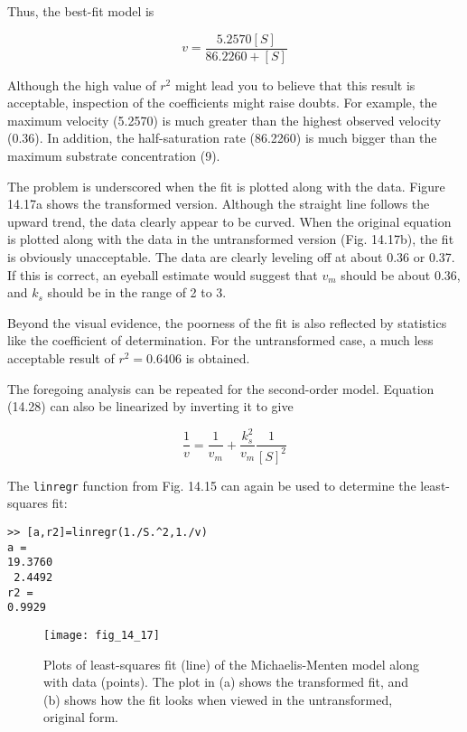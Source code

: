 \documentclass[../main.tex]{subfiles}
\begin{document}
\noindent Thus, the best-fit model is

\begin{equation}
	v = \frac{5.2570[S]}{86.2260 + [S]}
\end{equation}

Although the high value of $r^2$ might lead you to believe that this result is acceptable, inspection of the coefficients might raise doubts. For example, the maximum velocity (5.2570) is much greater than the highest observed velocity (0.36). In addition, the half-saturation rate (86.2260) is much bigger than the maximum substrate concentration (9).

The problem is underscored when the fit is plotted along with the data. Figure 14.17a shows the transformed version. Although the straight line follows the upward trend, the data clearly appear to be curved. When the original equation is plotted along with the data in the untransformed version (Fig. 14.17b), the fit is obviously unacceptable. The data are clearly leveling off at about 0.36 or 0.37. If this is correct, an eyeball estimate would suggest that $v_m$ should be about 0.36, and $k_s$ should be in the range of 2 to 3.

Beyond the visual evidence, the poorness of the fit is also reflected by statistics like the coefficient of determination. For the untransformed case, a much less acceptable result of $r^2 = 0.6406$ is obtained.


The foregoing analysis can be repeated for the second-order model. Equation (14.28) can also be linearized by inverting it to give

\begin{equation}
	\frac{1}{v} = \frac{1}{v_m} + \frac{k^2_s}{v_m} \frac{1}{[S]^2}
\end{equation}

The \texttt{linregr} function from Fig. 14.15 can again be used to determine the least-squares fit:

\begin{lstlisting}[numbers=none] 
>> [a,r2]=linregr(1./S.^2,1./v)
a =
19.3760
 2.4492
r2 =
0.9929
\end{lstlisting}

\begin{figure}[H] 
	\centering
	\texttt{[image: fig\_14\_17]}
	\caption{\textsf{Plots of least-squares fit (line) of the Michaelis-Menten model along with data (points). The plot in (a) shows the transformed fit, and (b) shows how the fit looks when viewed in the untransformed, original form.}}
	\label{fig:fig_14_17}
\end{figure}
\end{document}
